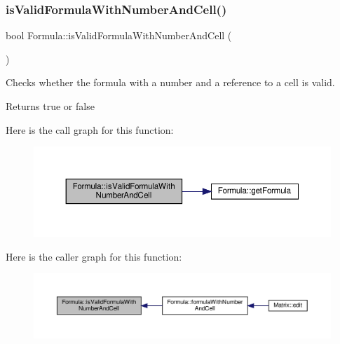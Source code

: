 \subsubsection{\texorpdfstring{is\+Valid\+Formula\+With\+Number\+And\+Cell()}{isValidFormulaWithNumberAndCell()}}
{\footnotesize\ttfamily bool Formula\+::is\+Valid\+Formula\+With\+Number\+And\+Cell (\begin{DoxyParamCaption}{ }\end{DoxyParamCaption})\hspace{0.3cm}{\ttfamily [private]}}

Checks whether the formula with a number and a reference to a cell is valid. \begin{DoxyReturn}{Returns}
true or false 
\end{DoxyReturn}
Here is the call graph for this function\+:\nopagebreak
\begin{figure}[H]
\begin{center}
\leavevmode
\includegraphics[width=350pt]{class_formula_a83eff8c83a0ea79b3dd21c2e86a546c8_cgraph}
\end{center}
\end{figure}
Here is the caller graph for this function\+:\nopagebreak
\begin{figure}[H]
\begin{center}
\leavevmode
\includegraphics[width=350pt]{class_formula_a83eff8c83a0ea79b3dd21c2e86a546c8_icgraph}
\end{center}
\end{figure}
\mbox{\label{class_formula_a0a2b13b0f741ea650e1ae71269dde9a5}} 
